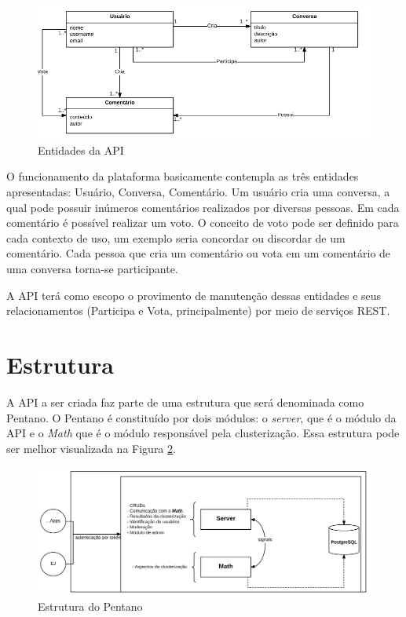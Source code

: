 \begin{figure}[h!]
\centering
\includegraphics[scale=0.5]{figuras/entidades.png}
\caption{Entidades da API}
\label{fig:entidades}
\end{figure}

O funcionamento da plataforma basicamente contempla as três entidades apresentadas: Usuário, Conversa, Comentário. Um usuário cria uma conversa, a qual
pode possuir inúmeros comentários realizados por diversas pessoas. Em cada comentário é possível realizar um voto. O conceito de voto pode ser definido
para cada contexto de uso, um exemplo seria concordar ou discordar de um comentário. Cada pessoa que cria um comentário ou vota em um comentário
de uma conversa torna-se participante. 

A API terá como escopo o provimento de manutenção dessas entidades e seus relacionamentos (Participa e Vota, principalmente) por meio de serviços REST.


\section{Estrutura}

A API a ser criada faz parte de uma estrutura que será denominada como Pentano. O Pentano é constituído por dois módulos: o \textit{server}, que é o módulo da API
e o \textit{Math} que é o módulo responsável pela clusterização. Essa estrutura pode ser melhor visualizada na Figura \ref{fig:pentano}.

\begin{figure}[h!]
\centering
\includegraphics[scale=0.5]{figuras/esquema_pentano.png}
\caption{Estrutura do Pentano}
\label{fig:pentano}
\end{figure}


